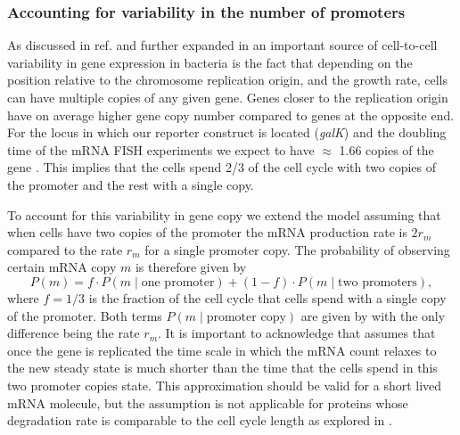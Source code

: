 \subsubsection*{Accounting for variability in the number of promoters}

As discussed in ref. \cite{Jones2014a} and further expanded in
\cite{Peterson2015} an important source of cell-to-cell variability in gene
expression in bacteria is the fact that depending on the position relative to
the chromosome replication origin, and the growth rate, cells can have multiple
copies of any given gene. Genes closer to the replication origin have on average
higher gene copy number compared to genes at the opposite end. For the locus in
which our reporter construct is located (\textit{galK}) and the doubling time of
the mRNA FISH experiments we expect to have $\approx$ 1.66 copies of the gene
\cite{Jones2014a, Bremer1996}. This implies that the cells spend 2/3 of the cell
cycle with two copies of the promoter and the rest with a single copy.

To account for this variability in gene copy we extend the model assuming that
when cells have two copies of the promoter the mRNA production rate is $2 r_m$
compared to the rate $r_m$ for a single promoter copy. The probability of
observing certain mRNA copy $m$ is therefore given by
\begin{equation}
  P(m) = f \cdot P(m \mid \text{one promoter}) +
  (1 - f) \cdot P(m \mid \text{two promoters}),
  \label{seq_prob_multipromoter}
\end{equation}
where $f = 1/3$ is the fraction of the cell cycle that cells spend with a single
copy of the promoter. Both terms $P(m \mid \text{promoter copy})$ are given by
 with the only difference being the rate $r_m$. It is
important to acknowledge that  assumes that once
the gene is replicated the time scale in which the mRNA count relaxes to the new
steady state is much shorter than the time that the cells spend in this two
promoter copies state. This approximation should be valid for a short lived mRNA
molecule, but the assumption is not applicable for proteins whose degradation
rate is comparable to the cell cycle length as explored in
.


